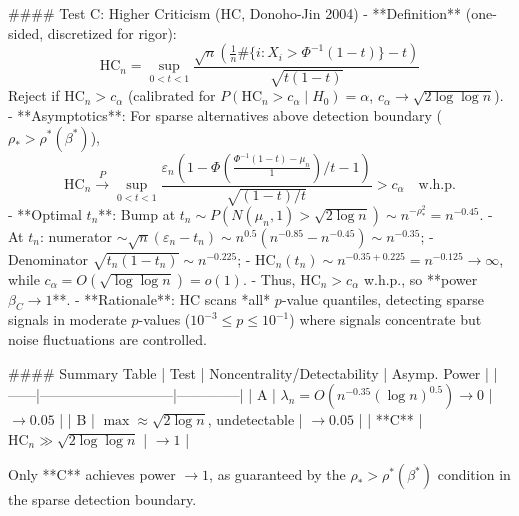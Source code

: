 #### Test C: Higher Criticism (HC, Donoho-Jin 2004)
- **Definition** (one-sided, discretized for rigor):
  $$
  \text{HC}_n = \sup_{0<t<1} \frac{ \sqrt{n} \left( \frac{1}{n} \#\{i: X_i > \Phi^{-1}(1-t) \} - t \right) }{ \sqrt{ t(1-t) } }
  $$
  Reject if $\text{HC}_n > c_\alpha$ (calibrated for $P(\text{HC}_n > c_\alpha \mid H_0) = \alpha$, $c_\alpha \to \sqrt{2\log\log n}$).
- **Asymptotics**: For sparse alternatives above detection boundary ($\rho_* > \rho^*(\beta^*)$), 
  $$
  \text{HC}_n \stackrel{P}{\to} \sup_{0<t<1} \frac{ \varepsilon_n \left(1-\Phi\left( \frac{\Phi^{-1}(1-t) - \mu_n}{1} \right) / t - 1 \right) }{ \sqrt{ (1-t)/t } } > c_\alpha \quad \text{w.h.p.}
  $$
- **Optimal $t_n$**: Bump at $t_n \sim P(N(\mu_n,1) > \sqrt{2\log n}) \sim n^{-\rho_*^2} = n^{-0.45}$.
  - At $t_n$: numerator $\sim \sqrt{n} (\varepsilon_n - t_n) \sim n^{0.5}(n^{-0.85} - n^{-0.45}) \sim n^{-0.35}$;
  - Denominator $\sqrt{t_n(1-t_n)} \sim n^{-0.225}$;
  - $\text{HC}_n(t_n) \sim n^{-0.35 + 0.225} = n^{-0.125} \to \infty$, while $c_\alpha = O(\sqrt{\log\log n}) = o(1)$.
- Thus, $\text{HC}_n > c_\alpha$ w.h.p., so **power $\beta_C \to 1$**.
- **Rationale**: HC scans *all* $p$-value quantiles, detecting sparse signals in moderate $p$-values ($10^{-3}\le p \le 10^{-1}$) where signals concentrate but noise fluctuations are controlled.

#### Summary Table
| Test | Noncentrality/Detectability | Asymp. Power |
|------|-----------------------------|--------------|
| A    | $\lambda_n = O(n^{-0.35} (\log n)^{0.5}) \to 0$ | $\to 0.05$ |
| B    | $\max \approx \sqrt{2\log n}$, undetectable | $\to 0.05$ |
| **C** | $\text{HC}_n \gg \sqrt{2\log\log n}$ | $\to 1$ |

Only **C** achieves power $\to 1$, as guaranteed by the $\rho_* > \rho^*(\beta^*)$ condition in the sparse detection boundary.
